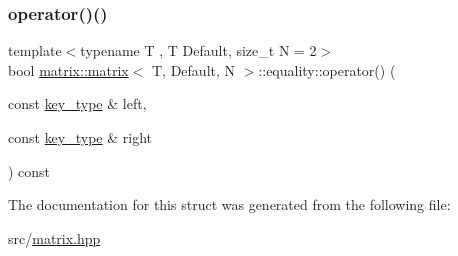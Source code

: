 \mbox{\label{structmatrix_1_1matrix_1_1equality_ac28cf4d42be01a4827c0c224dd105fd1}} 
\subsubsection{\texorpdfstring{operator()()}{operator()()}}
{\footnotesize\ttfamily template$<$typename T , T Default, size\+\_\+t N = 2$>$ \\
bool \hyperlink{structmatrix_1_1matrix}{matrix\+::matrix}$<$ T, Default, N $>$\+::equality\+::operator() (\begin{DoxyParamCaption}\item[{const \hyperlink{structmatrix_1_1matrix_af7b5498ac1b615cb9ef51bd185a2557e}{key\+\_\+type} \&}]{left,  }\item[{const \hyperlink{structmatrix_1_1matrix_af7b5498ac1b615cb9ef51bd185a2557e}{key\+\_\+type} \&}]{right }\end{DoxyParamCaption}) const\hspace{0.3cm}{\ttfamily [inline]}}



The documentation for this struct was generated from the following file\+:\begin{DoxyCompactItemize}
\item 
src/\hyperlink{matrix_8hpp}{matrix.\+hpp}\end{DoxyCompactItemize}
